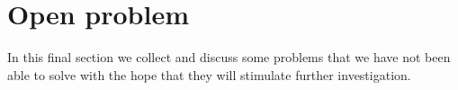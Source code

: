 \documentclass[11pt,reqno]{amsart}
\theoremstyle{definition}
\begin{document}
%


\section{Open problem}\label{s4}
In this final section we collect and discuss some problems that we have not been able to solve
with the hope that they will stimulate further investigation.
\end{document}

